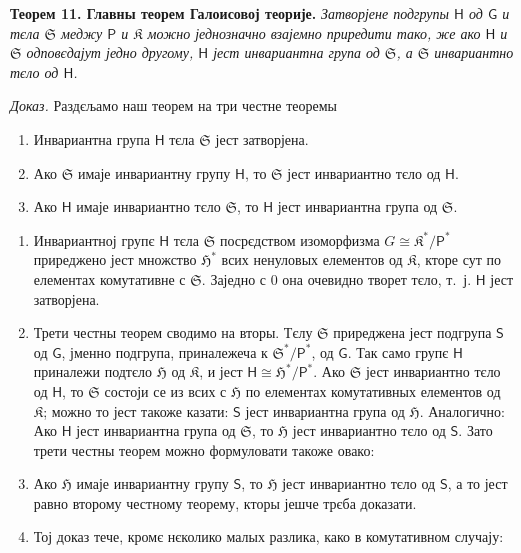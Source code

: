 \documentclass[11pt]{article}
\begin{document}
\textbf{Теорем 11. Главны теорем Галоисовој теорије.} \emph{Затворјене подгрупы \(\mathsf{H}\) од \(\mathsf{G}\) и тєла \(\mathfrak S\) меджу \(\mathsf P\) и \(\mathfrak K\) можно једнозначно взајемно приредити тако, же ако \(\mathsf{H}\) и \(\mathfrak S\) одповєдајут једно другому, \(\mathsf{H}\) јест инвариантна група од \(\mathfrak S\), а \(\mathfrak S\) инвариантно тєло од \(\mathsf{H}\).}

\emph{Доказ.} Раздєљамо наш теорем на три честне теоремы
\begin{enumerate}
\item Инвариантна група \(\mathsf{H}\) тєла \(\mathfrak S\) јест затворјена.
\item Ако \(\mathfrak S\) имаје инвариантну групу \(\mathsf{H}\), то \(\mathfrak S\) јест инвариантно тєло од \(\mathsf{H}\).
\item Ако \(\mathsf{H}\) имаје инвариантно тєло \(\mathfrak S\), то \(\mathsf{H}\) јест инвариантна група од \(\mathfrak S\).
\end{enumerate}

\begin{enumerate}
\item Инвариантној групє \(\mathsf{H}\) тєла \(\mathfrak S\) посрєдством изоморфизма \(G\cong \mathfrak K^*/\mathsf P^*\) приреджено јест множство \(\mathfrak H^*\) всих ненуловых елементов од \(\mathfrak K\), кторе сут по елементах комутативне с \(\mathfrak S\). Заједно с 0 она очевидно творет тєло, т.~ј. \(\mathsf{H}\) јест затворјена.

\item Трети честны теорем сводимо на вторы. Тєлу \(\mathfrak S\) приреджена јест подгрупа \(\mathsf{S}\) од \(\mathsf{G}\), јменно подгрупа, приналежеча к \(\mathfrak S^*/\mathsf P^*\), од \(\mathsf{G}\). Так само групє \(\mathsf{H}\) приналежи подтєло \(\mathfrak H\) од \(\mathfrak K\), и јест \(\mathsf{H}\cong \mathfrak H^*/\mathsf P^*\). Ако \(\mathfrak S\) јест инвариантно тєло од \(\mathsf{H}\), то \(\mathfrak S\) состоји се из всих с \(\mathfrak H\) по елементах комутативных елементов од \(\mathfrak K\); можно то јест такоже казати: \(\mathsf{S}\) јест инвариантна група од \(\mathfrak H\). Аналогично: Ако \(\mathsf{H}\) јест инвариантна група од \(\mathfrak S\), то \(\mathfrak H\) јест инвариантно тєло од \(\mathsf{S}\). Зато трети честны теорем можно формуловати такоже овако:

\item[\(3'\).] Ако \(\mathfrak H\) имаје инвариантну групу \(\mathsf{S}\), то \(\mathfrak H\) јест инвариантно тєло од \(\mathsf{S}\), а то јест равно второму честному теорему, кторы јешче трєба доказати.

\item[3.] Тој доказ тече, кромє нєколико малых разлика, како в комутативном случају:
\end{enumerate}
\end{document}
